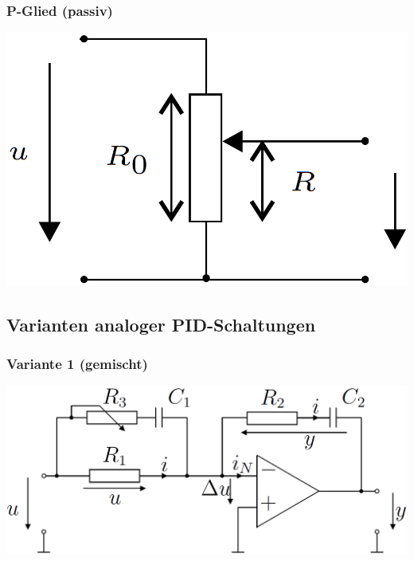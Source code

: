 \subsubsection{P-Glied (passiv)}

\begin{minipage}[c]{0.48\columnwidth}
    \includegraphics[width=\columnwidth]{images/spannungsteiler.png}
\end{minipage}
\hfill
\begin{minipage}[c]{0.48\columnwidth}
    
\end{minipage}




\subsection{Varianten analoger PID-Schaltungen}

\subsubsection{Variante 1 (gemischt)}

\begin{minipage}[c]{0.48\columnwidth}
    \includegraphics[width=\columnwidth]{images/realisierung_pid-regler_variante_1.png}
\end{minipage}
\hfill
\begin{minipage}[c]{0.48\columnwidth}
    
\end{minipage}


